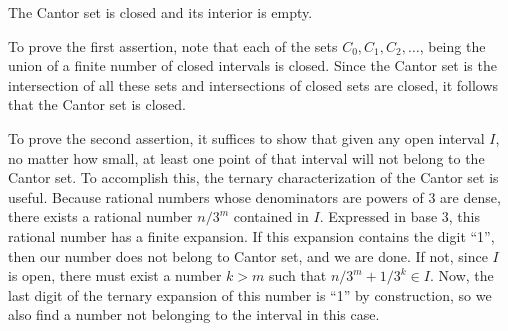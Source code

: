 \documentclass[12pt]{article}
\begin{document}
The Cantor set is closed and its interior is empty.

To prove the first assertion, note that each of the sets $C_0, C_1,
C_2, \ldots$, being the union of a finite number of closed intervals
is closed.  Since the Cantor set is the intersection of all these sets
and intersections of closed sets are closed, it follows that the
Cantor set is closed.

To prove the second assertion, it suffices to show that given any open
interval $I$, no matter how small, at least one point of that interval
will not belong to the Cantor set.  To accomplish this, the ternary
characterization of the Cantor set is useful.  Because rational
numbers whose denominators are powers of 3 are dense, there exists a
rational number $n/3^m$ contained in $I$.  Expressed in base 3, this
rational number has a finite expansion.  If this expansion contains
the digit ``1'', then our number does not belong to Cantor set, and we
are done.  If not, since $I$ is open, there must exist a number $k >
m$ such that $n/3^m + 1/3^k \in I$.  Now, the last digit of the ternary 
expansion of this number is ``1'' by construction, so we also find a 
number not belonging to the interval in this case.
\end{document}
